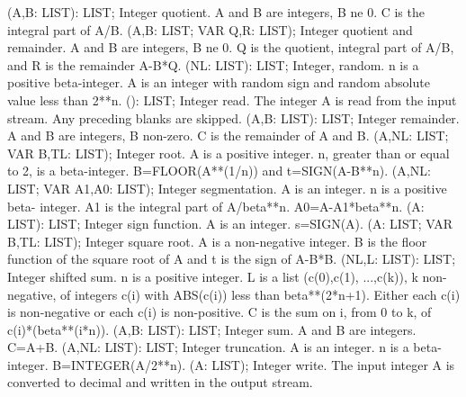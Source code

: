  (A,B: LIST): LIST; \eproc
\bcom Integer quotient. A and B are integers, B ne 0. C is the integral
part of A/B. \ecom 
{} (A,B: LIST; VAR Q,R: LIST); \eproc
\bcom Integer quotient and remainder. A and B are integers, B ne 0. Q is
the quotient, integral part of A/B, and R is the remainder A-B*Q. \ecom 
{} (NL: LIST): LIST; \eproc
\bcom Integer, random. n is a positive beta-integer. A is an integer
with random sign and random absolute value less than 2**n. \ecom 
{} (): LIST; \eproc
\bcom Integer read. The integer A is read from the input stream. Any
preceding blanks are skipped. \ecom 
{} (A,B: LIST): LIST; \eproc
\bcom Integer remainder. A and B are integers, B non-zero. C is the
remainder of A and B. \ecom 
{} (A,NL: LIST; VAR B,TL: LIST); \eproc
\bcom Integer root. A is a positive integer. n, greater than or equal
to 2, is a beta-integer. B=FLOOR(A**(1/n)) and t=SIGN(A-B**n). \ecom 
{} (A,NL: LIST; VAR A1,A0: LIST); \eproc
\bcom Integer segmentation. A is an integer. n is a positive beta-
integer. A1 is the integral part of A/beta**n. A0=A-A1*beta**n. \ecom 
{} (A: LIST): LIST; \eproc
\bcom Integer sign function. A is an integer. s=SIGN(A). \ecom 
{} (A: LIST; VAR B,TL: LIST); \eproc
\bcom Integer square root. A is a non-negative integer. B is the floor
function of the square root of A and t is the sign of A-B*B. \ecom 
{} (NL,L: LIST): LIST; \eproc
\bcom Integer shifted sum. n is a positive integer. L is a list
(c(0),c(1), ...,c(k)), k non-negative, of integers c(i) with
ABS(c(i)) less than beta**(2*n+1).  Either each c(i) is
non-negative or each c(i) is non-positive.  C is the sum on i,
from 0 to k, of c(i)*(beta**(i*n)). \ecom 
{} (A,B: LIST): LIST; \eproc
\bcom Integer sum. A and B are integers. C=A+B. \ecom 
{} (A,NL: LIST): LIST; \eproc
\bcom Integer truncation. A is an integer. n is a beta-integer.
B=INTEGER(A/2**n). \ecom 
{} (A: LIST); \eproc
\bcom Integer write. The input integer A is converted to decimal and
written in the output stream. \ecom 
